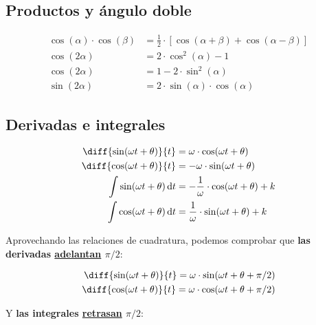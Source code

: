 \documentclass[article, a4paper]{memoir}
\DeclareMathOperator{\di}{d\!}
\begin{document}
\vspace{-5mm}
\subsection{Productos y ángulo doble}

\vspace{-10mm}
\begin{align*}
  \cos(\alpha) \cdot \cos(\beta) &= \frac{1}{2} \cdot [ \cos(\alpha+\beta) + \cos(\alpha-\beta) ]\\
  \cos(2\alpha) &= 2 \cdot \cos^2(\alpha) - 1\\
  \cos(2\alpha) &= 1- 2 \cdot \sin^2(\alpha)\\
  \sin(2\alpha) &= 2 \cdot \sin(\alpha) \cdot \cos(\alpha)
\end{align*}

\vspace{-5mm}
\subsection{Derivadas e integrales}

\vspace{-10mm}
\begin{align*}
    \diff{\sin(\omega t + \theta)}{t} &= \omega \cdot \cos(\omega t + \theta)\\
    \diff{\cos(\omega t + \theta)}{t} &= - \omega \cdot \sin(\omega t + \theta)\\
    \int \sin(\omega t + \theta) \di t &= -\frac{1}{\omega} \cdot \cos(\omega t + \theta) + k\\
    \int \cos(\omega t + \theta) \di t &= \frac{1}{\omega} \cdot \sin(\omega t + \theta) + k
\end{align*}


Aprovechando las relaciones de cuadratura, podemos comprobar que \textbf{\color{blue!50!black} las derivadas \underline{adelantan} $\pi/2$}:

\vspace{-5mm}
\begin{align*}
  \diff{\sin(\omega t + \theta)}{t} = \omega \cdot \sin(\omega t + \theta + \pi/2)\\
  \diff{\cos(\omega t + \theta)}{t} = \omega \cdot \cos(\omega t + \theta + \pi/2)
\end{align*}

\vspace{-3mm}
Y \textbf{\color{blue!50!black}las integrales \underline{retrasan} $\pi/2$}:
\end{document}
